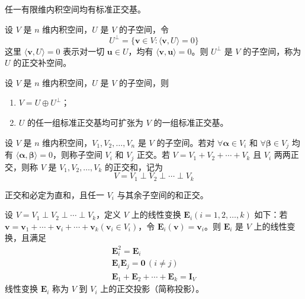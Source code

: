 \begin{corollary}
    任一有限维内积空间均有标准正交基。
\end{corollary}

\begin{definition}
    设 $V$ 是 $n$ 维内积空间，$U$ 是 $V$ 的子空间，令
    \[
        U^{\perp} = \{\bm{v} \in V : \langle \bm{v}, U \rangle = 0\}
    \]
    这里 $\langle \bm{v}, U \rangle = 0$ 表示对一切 $\bm{u} \in U$，均有 $\langle \bm{v}, \bm{u} \rangle = 0$。则 $U^{\perp}$ 是 $V$ 的子空间，称为 $U$ 的正交补空间。
\end{definition}

\begin{theorem}
    设 $V$ 是 $n$ 维内积空间，$U$ 是 $V$ 的子空间，则
    \begin{enumerate}
        \item $V = U \oplus U^{\perp}$；
        \item $U$ 的任一组标准正交基均可扩张为 $V$ 的一组标准正交基。
    \end{enumerate}
\end{theorem}

\begin{definition}
    设 $V$ 是 $n$ 维内积空间，$V_1, V_2, \ldots, V_n$ 是 $V$ 的子空间。若对 $\forall \bm{\alpha} \in V_i$ 和 $\forall \bm{\beta} \in V_j$ 均有 $\langle \bm{\alpha}, \bm{\beta} \rangle = 0$，则称子空间 $V_i$ 和 $V_j$ 正交。若 $V = V_1 + V_2 + \cdots + V_k$ 且 $V_i$ 两两正交，则称 $V$ 是 $V_1, V_2, \ldots, V_k$ 的正交和，记为
    \[
        V = V_1 \perp V_2 \perp \cdots \perp V_k
    \]
\end{definition}

\begin{lemma}
    正交和必定为直和，且任一 $V_i$ 与其余子空间的和正交。
\end{lemma}

\begin{definition}
    设 $V = V_1 \perp V_2 \perp \cdots \perp V_k$，定义 $V$ 上的线性变换 $\bm{E}_{i}(i = 1, 2, \ldots, k)$ 如下：若 $\bm{v} = \bm{v}_{1} + \cdots + \bm{v}_{i} + \cdots + \bm{v}_{k}(\bm{v}_{i} \in V_i)$，令 $\bm{E}_{i}(\bm{v}) = \bm{v}_{i}$。则 $\bm{E}_i$ 是 $V$ 上的线性变换，且满足
    \begin{gather*}
        \bm{E}_{i}^2 = \bm{E}_i \\
        \bm{E}_{i}\bm{E}_{j} = \bm{0}\, (i \neq j) \\
        \bm{E}_{1} + \bm{E}_{2} + \cdots + \bm{E}_{k} = \bm{I}_V
    \end{gather*}
    线性变换 $\bm{E}_i$ 称为 $V$ 到 $V_i$ 上的正交投影（简称投影）。
\end{definition}

